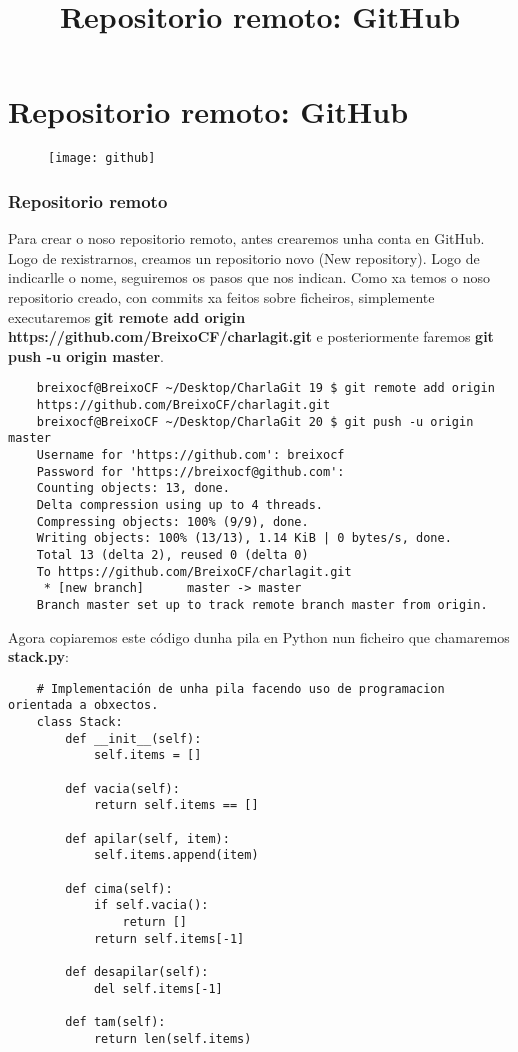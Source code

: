 \section{Repositorio remoto: GitHub}

\title[Git e GitHub]{Repositorio remoto: GitHub}
\author[Fran Rúa e Breixo Camiña]{}

\begin{frame}
  \titlepage
  \begin{figure}[H]
    \centering
    \label{fig:github}
    \texttt{[image: github]}
  \end{figure}
\end{frame}

\begin{frame}[fragile]
  \frametitle{Repositorio remoto}
  \scriptsize
  Para crear o noso repositorio remoto, antes crearemos unha conta en GitHub. Logo de rexistrarnos, creamos un repositorio novo (New repository). Logo de indicarlle o nome, seguiremos os pasos que nos indican. Como xa temos o noso repositorio creado, con commits xa feitos sobre ficheiros, simplemente executaremos \textbf{git remote add origin https://github.com/BreixoCF/charlagit.git} e posteriormente faremos \textbf{git push -u origin master}.
  \tiny
\begin{verbatim}
	breixocf@BreixoCF ~/Desktop/CharlaGit 19 $ git remote add origin 
	https://github.com/BreixoCF/charlagit.git
	breixocf@BreixoCF ~/Desktop/CharlaGit 20 $ git push -u origin master 
	Username for 'https://github.com': breixocf
	Password for 'https://breixocf@github.com': 
	Counting objects: 13, done.
	Delta compression using up to 4 threads.
	Compressing objects: 100% (9/9), done.
	Writing objects: 100% (13/13), 1.14 KiB | 0 bytes/s, done.
	Total 13 (delta 2), reused 0 (delta 0)
	To https://github.com/BreixoCF/charlagit.git
	 * [new branch]      master -> master
	Branch master set up to track remote branch master from origin.
\end{verbatim}	
\end{frame}

\begin{frame}[fragile]
  \scriptsize
  Agora copiaremos este código dunha pila en Python nun ficheiro que chamaremos \textbf{stack.py}:
  \tiny
\begin{verbatim}
	# Implementación de unha pila facendo uso de programacion orientada a obxectos.
	class Stack:
	    def __init__(self):
	        self.items = []
	
	    def vacia(self):
	        return self.items == []
	
	    def apilar(self, item):
	        self.items.append(item)
	
	    def cima(self):
	        if self.vacia():
	            return []
	        return self.items[-1]
	
	    def desapilar(self):
	        del self.items[-1]
	
	    def tam(self):
	        return len(self.items)
\end{verbatim}
\end{frame}

